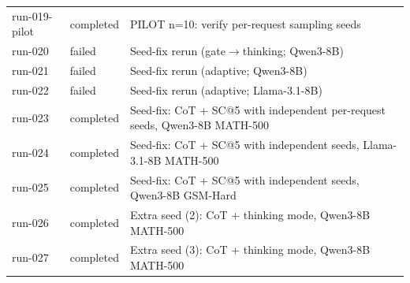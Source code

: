 \begin{tabular}{llp{10.5cm}}
run-019-pilot & completed & PILOT n=10: verify per-request sampling seeds \\
run-020 & failed & Seed-fix rerun (gate$\rightarrow$thinking; Qwen3-8B) \\
run-021 & failed & Seed-fix rerun (adaptive; Qwen3-8B) \\
run-022 & failed & Seed-fix rerun (adaptive; Llama-3.1-8B) \\
run-023 & completed & Seed-fix: CoT + SC@5 with independent per-request seeds, Qwen3-8B MATH-500 \\
run-024 & completed & Seed-fix: CoT + SC@5 with independent seeds, Llama-3.1-8B MATH-500 \\
run-025 & completed & Seed-fix: CoT + SC@5 with independent seeds, Qwen3-8B GSM-Hard \\
run-026 & completed & Extra seed (2): CoT + thinking mode, Qwen3-8B MATH-500 \\
run-027 & completed & Extra seed (3): CoT + thinking mode, Qwen3-8B MATH-500 \\
\bottomrule
\end{tabular}
